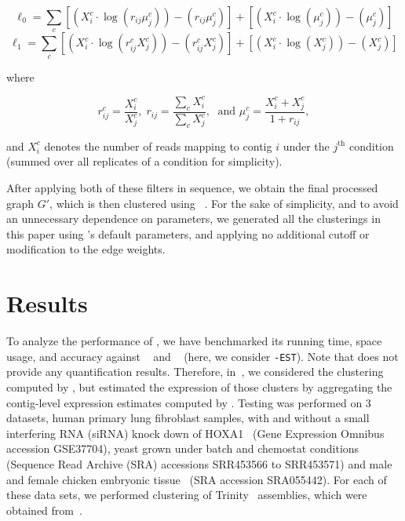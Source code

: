 \begin{equation}
\ell_0 = \sum_{c} \left[\left(X_i^{c} \cdot \log\left(r_{ij} \mu_j^{c}\right)\right) - \left(r_{ij} \mu_j^{c}\right)\right] + \left[\left(X_i^{c} \cdot \log\left(\mu_j^{c}\right)\right) - \left(\mu_j^{c}\right)\right]
\label{eqn:likelihood_null}
\end{equation}
\begin{equation}
\ell_1 = \sum_{c} \left[\left(X_i^{c} \cdot \log\left(r_{ij}^{c} X_j^{c}\right)\right) - \left(r_{ij}^{c} X_j^{c}\right)\right] + \left[\left(X_i^{c} \cdot \log\left(X_j^{c}\right)\right) - \left(X_j^{c}\right)\right]
\label{eqn:likelihood_alt}
\end{equation}

where

$$r_{ij}^{c} = \frac{X_i^{c}}{X_j^{c}},\; r_{ij} = \frac{\sum_{c}X_i^{c}}{\sum_{c}X_j^{c}},\; \text{ and } \mu_{j}^{c} = \frac{X_{i}^{c} + X_{j}^{c}}{1 + r_{ij}},$$

and $X_i^{c}$ denotes the number of reads mapping to contig $i$ under the $j^{\text{th}}$ condition (summed over all replicates of a condition for simplicity).

After applying both of these filters in sequence, we obtain the final processed graph $G'$, which is then clustered using \mcl~\cite{mcl}.  For the sake of simplicity, and to avoid an unnecessary dependence on parameters, we generated all the clusterings in this paper using \mcl's default parameters, and applying no additional cutoff or modification to the edge weights. 

\section{Results}
To analyze the performance of \rapclust, we have benchmarked its running time, space usage, and accuracy against \corset~\citep{corset} and \cdhit~\citep{cdhit,cdhit2} (here, we consider \cdhit\texttt{-EST}). Note that \cdhit does not provide any quantification results.  Therefore, in~, we considered the clustering computed by \cdhit, but estimated the expression of those clusters by aggregating the contig-level expression estimates computed by \sailfish.  Testing was performed on 3 datasets, human primary lung fibroblast samples, with and without a small interfering RNA (siRNA) knock down of HOXA1~\citep{humandata} (Gene Expression Omnibus accession GSE37704), yeast grown under batch and chemostat conditions~\citep{yeastdata} (Sequence Read Archive (SRA) accessions SRR453566 to SRR453571) and male and female chicken embryonic tissue~\citep{chickendata} (SRA accession SRA055442). For each of these data sets, we performed clustering of Trinity~\citep{trinity} \denovo assemblies, which were obtained from~\citep{corset_data}. 

